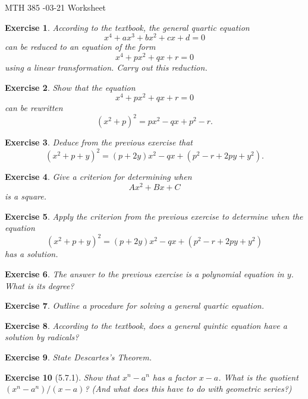 \documentclass[12pt]{article}
\theoremstyle{plain}
\newtheorem{ex}{Exercise}
\begin{document}
MTH 385 -03-21 Worksheet

\begin{ex}
  According to the textbook, the general \emph{quartic} equation
  \[
    x^4+ax^3+bx^2+cx+d=0
  \]
  can be reduced to an equation of the form
  \[
    x^4+px^2+qx+r=0
  \]
  using a linear transformation. Carry out this reduction.
\end{ex}

\begin{ex}
  Show that the equation
  \[
    x^4+px^2+qx+r=0
  \]
  can be rewritten
  \[
    (x^2+p)^2=px^2-qx+p^2-r.
  \]
\end{ex}

\begin{ex}
  Deduce from the previous exercise that
  \[
    (x^2+p+y)^2=(p+2y)x^2-qx+(p^2-r+2py+y^2).
  \]
\end{ex}

\begin{ex}
  Give a criterion for determining when
  \[
    Ax^2+Bx+C
  \]
  is a square.
\end{ex}

\begin{ex}
  Apply the criterion from the previous exercise to determine when the equation
  \[
    (x^2+p+y)^2=(p+2y)x^2-qx+(p^2-r+2py+y^2)
  \]
  has a solution.
\end{ex}

\begin{ex}
  The answer to the previous exercise is a polynomial equation in $y$. What is its degree?
\end{ex}

\begin{ex}
  Outline a procedure for solving a general quartic equation.
\end{ex}

\begin{ex}
  According to the textbook, does a general \emph{quintic} equation have a \emph{solution by radicals}?
\end{ex}

\begin{ex}
  State Descartes's Theorem.
\end{ex}

\begin{ex} [5.7.1]
  Show that $x^n-a^n$ has a factor $x-a$. What is the quotient $(x^n-a^n)/(x-a)$? (And what does this have to do with geometric series?)
\end{ex}
\end{document}
